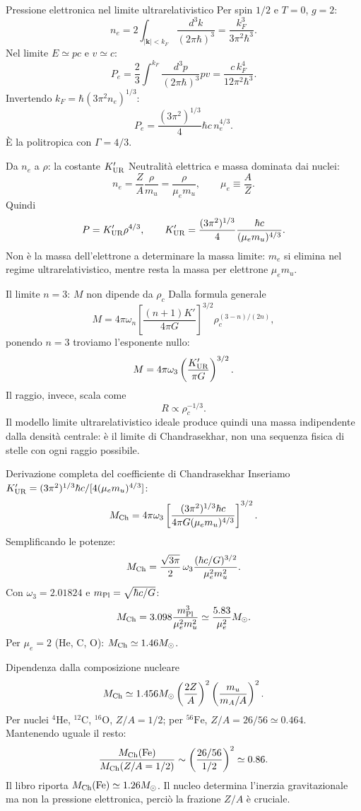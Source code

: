 \begin{frame}[t]{Pressione elettronica nel limite ultrarelativistico}
\small
Per spin $1/2$ e $T=0$, $g=2$:
\[
n_e=2\int_{|\mathbf k|<k_F}\frac{d^3k}{(2\pi\hbar)^3}
=\frac{k_F^3}{3\pi^2\hbar^3}.
\]
Nel limite $E\simeq pc$ e $v\simeq c$:
\[
P_e=\frac{2}{3}\int^{k_F}\frac{d^3p}{(2\pi\hbar)^3}pv
=\frac{c\,k_F^4}{12\pi^2\hbar^3}.
\]
Invertendo $k_F=\hbar(3\pi^2n_e)^{1/3}$:
\[
P_e=\frac{(3\pi^2)^{1/3}}4\hbar c\,n_e^{4/3}.
\]
È la politropica con $\Gamma=4/3$.
\end{frame}

\begin{frame}[t]{Da $n_e$ a $\rho$: la costante $K'_{\rm UR}$}
\small
Neutralità elettrica e massa dominata dai nuclei:
\[
n_e=\frac{Z}{A}\frac\rho{m_u}=\frac\rho{\mu_e m_u},\qquad\mu_e\equiv\frac AZ.
\]
Quindi
\[
P=K'_{\rm UR}\rho^{4/3},\qquad
K'_{\rm UR}=\frac{(3\pi^2)^{1/3}}4\frac{\hbar c}{(\mu_e m_u)^{4/3}}.
\]
Non è la massa dell'elettrone a determinare la massa limite: $m_e$ si elimina nel regime ultrarelativistico, mentre resta la massa per elettrone $\mu_e m_u$.
\end{frame}

\begin{frame}[t]{Il limite $n=3$: $M$ non dipende da $\rho_c$}
\small
Dalla formula generale
\[
M=4\pi\omega_n\left[\frac{(n+1)K'}{4\pi G}\right]^{3/2}
\rho_c^{(3-n)/(2n)},
\]
ponendo $n=3$ troviamo l'esponente nullo:
\[
M=4\pi\omega_3\left(\frac{K'_{\rm UR}}{\pi G}\right)^{3/2}.
\]
Il raggio, invece, scala come
\[
R\propto\rho_c^{-1/3}.
\]
Il modello limite ultrarelativistico ideale produce quindi una massa indipendente dalla densità centrale: è il limite di Chandrasekhar, non una sequenza fisica di stelle con ogni raggio possibile.
\end{frame}

\begin{frame}[t]{Derivazione completa del coefficiente di Chandrasekhar}
\small
Inseriamo $K'_{\rm UR}=(3\pi^2)^{1/3}\hbar c/[4(\mu_e m_u)^{4/3}]$:
\[
M_{\rm Ch}=4\pi\omega_3\left[
\frac{(3\pi^2)^{1/3}\hbar c}{4\pi G(\mu_e m_u)^{4/3}}
\right]^{3/2}.
\]
Semplificando le potenze:
\[
M_{\rm Ch}=\frac{\sqrt{3\pi}}2\,\omega_3
\frac{(\hbar c/G)^{3/2}}{\mu_e^2m_u^2}.
\]
Con $\omega_3=2.01824$ e $m_{\rm Pl}=\sqrt{\hbar c/G}$:
\[
M_{\rm Ch}=3.098\frac{m_{\rm Pl}^3}{\mu_e^2m_u^2}
\simeq\frac{5.83}{\mu_e^2}M_\odot.
\]
Per $\mu_e=2$ (He, C, O): $M_{\rm Ch}\simeq1.46M_\odot$.
\end{frame}

\begin{frame}[t]{Dipendenza dalla composizione nucleare}
\small
\[
M_{\rm Ch}\simeq1.456M_\odot
\left(\frac{2Z}{A}\right)^2\left(\frac{m_u}{m_A/A}\right)^2.
\]
Per nuclei $^4\mathrm{He}$, $^{12}\mathrm C$, $^{16}\mathrm O$, $Z/A=1/2$; per $^{56}\mathrm{Fe}$, $Z/A=26/56\simeq0.464$.
\medskip
Mantenendo uguale il resto:
\[
\frac{M_{\rm Ch}(\mathrm{Fe})}{M_{\rm Ch}(Z/A=1/2)}
\sim\left(\frac{26/56}{1/2}\right)^2\simeq0.86.
\]
Il libro riporta $M_{\rm Ch}(\mathrm{Fe})\simeq1.26M_\odot$. Il nucleo determina l'inerzia gravitazionale ma non la pressione elettronica, perciò la frazione $Z/A$ è cruciale.
\end{frame}

